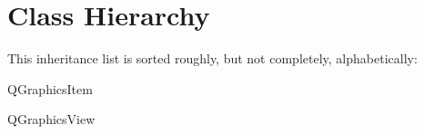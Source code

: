 \section{Class Hierarchy}
This inheritance list is sorted roughly, but not completely, alphabetically\+:\begin{DoxyCompactList}
\item {}
\item {}
\item {}
\item {}
\item Q\+Graphics\+Item\begin{DoxyCompactList}
\item {}
\item {}
\end{DoxyCompactList}
\item Q\+Graphics\+View\begin{DoxyCompactList}
\item {}
\end{DoxyCompactList}
\end{DoxyCompactList}
